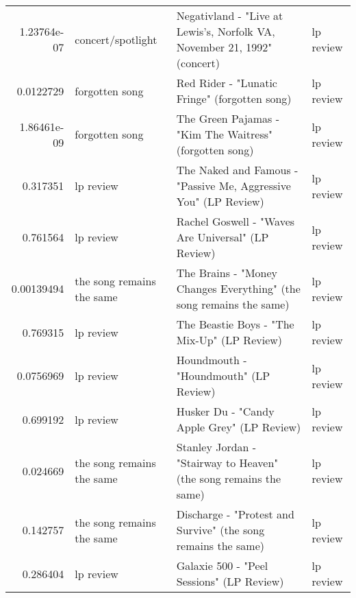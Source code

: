 \documentclass[letterpaper,10pt]{article}
\begin{document}
\begin{table}[H]
\begin{adjustbox}{max width=\linewidth}
\begin{tabular}{rlll}
  1.23764e-07 & concert/spotlight         & Negativland - "Live at Lewis's, Norfolk VA, November 21, 1992" (concert)                                     & lp review                 \\
  0.0122729   & forgotten song            & Red Rider - "Lunatic Fringe" (forgotten song)                                                                & lp review                 \\
  1.86461e-09 & forgotten song            & The Green Pajamas - "Kim The Waitress" (forgotten song)                                                      & lp review                 \\
  0.317351    & lp review                 & The Naked and Famous - "Passive Me, Aggressive You" (LP Review)                                              & lp review                 \\
  0.761564    & lp review                 & Rachel Goswell - "Waves Are Universal" (LP Review)                                                           & lp review                 \\
  0.00139494  & the song remains the same & The Brains - "Money Changes Everything" (the song remains the same)                                          & lp review                 \\
  0.769315    & lp review                 & The Beastie Boys - "The Mix-Up" (LP Review)                                                                  & lp review                 \\
  0.0756969   & lp review                 & Houndmouth - "Houndmouth" (LP Review)                                                                        & lp review                 \\
  0.699192    & lp review                 & Husker Du - "Candy Apple Grey" (LP Review)                                                                   & lp review                 \\
  0.024669    & the song remains the same & Stanley Jordan - "Stairway to Heaven" (the song remains the same)                                            & lp review                 \\
  0.142757    & the song remains the same & Discharge - "Protest and Survive" (the song remains the same)                                                & lp review                 \\
  0.286404    & lp review                 & Galaxie 500 - "Peel Sessions" (LP Review)                                                                    & lp review                 \\

\end{tabular}
\end{adjustbox}
\end{table}
\end{document}
